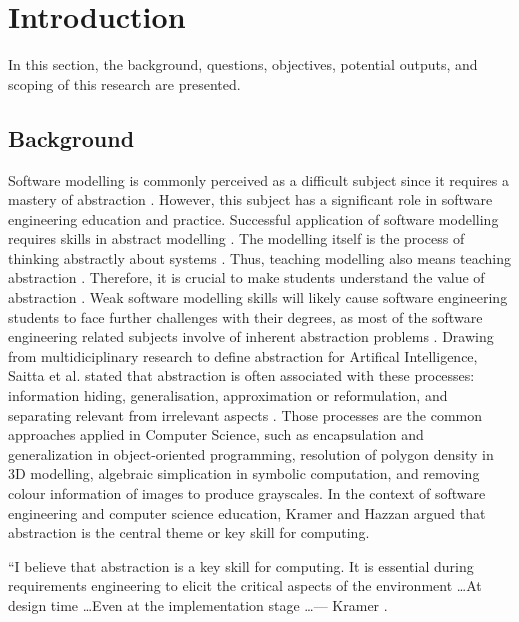 \documentclass[12pt, a4paper]{report} \usepackage[titletoc]{appendix}
\begin{document}
\chapter{Introduction}
\label{Introduction}
In this section, the background, questions, objectives, potential outputs, and scoping of this research are presented.

\section{Background}
Software modelling is commonly perceived as a difficult subject since it
requires a mastery of abstraction \cite{Borstler2012}. However, this subject
has a significant role in software engineering education and
practice. Successful application of software modelling requires skills in
abstract modelling \cite{whittle2013industrial}. The modelling itself is the
process of thinking abstractly about systems \cite{bezivin2009teaching}. Thus,
teaching modelling also means teaching abstraction \cite{engels2005teaching}.
Therefore, it is crucial to make students understand the value of abstraction
\cite{bezivin2009teaching}. Weak software modelling skills will likely cause
software engineering students to face further challenges with their degrees, as
most of the software engineering related subjects involve of inherent
abstraction problems \cite{Kramer2007}. Drawing from multidiciplinary research to define abstraction for Artifical Intelligence, Saitta et al. stated that abstraction is often associated with these processes: information hiding, generalisation, approximation or reformulation, and separating relevant from irrelevant aspects \cite{Saitta2013}. Those processes are the common approaches applied in Computer Science, such as encapsulation  and generalization in object-oriented programming, resolution of polygon density in 3D modelling, algebraic simplication in symbolic computation, and removing colour information of images to produce grayscales. In the context of software engineering and computer science education, Kramer \cite{Kramer2007} and Hazzan \cite{hazzan2008reflections} argued that abstraction is the central theme or key
skill for computing.

\begin{displayquote}
``I believe that abstraction is a key skill for computing. It is essential
during requirements engineering to elicit the critical aspects of the 
environment \dots At design time \dots Even at the implementation stage
\dots --- Kramer \cite{Kramer2007}.
\end{displayquote}
\end{document}
